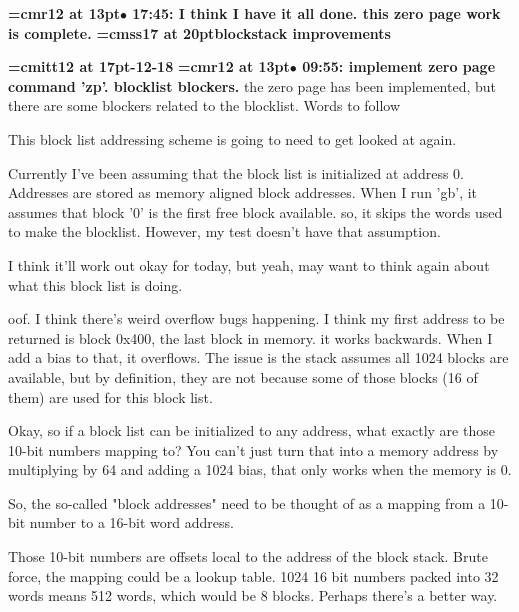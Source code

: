 {\smallskip\noindent\bf\font\titlefont=cmr12 at 13pt\titlefont $\bullet$ 17:45: I think I have it all done. this zero page work is complete.}\smallskip
{}
{\medskip\noindent\bf\font\titlefont=cmss17 at 20pt\titlefont blockstack improvements}\medskip

{\medskip\noindent\bf\font\titlefont=cmitt12 at 17pt-12-18}\medskip
{\smallskip\noindent\bf\font\titlefont=cmr12 at 13pt\titlefont $\bullet$ 09:55: implement zero page command 'zp'. blocklist blockers.}\smallskip
the zero page has been implemented, but there are some blockers related to the blocklist. Words to follow
\par

This block list addressing scheme is going to need to get looked at again.
\par

Currently I've been assuming that the block list is initialized at address 0. Addresses are stored as memory aligned block addresses. When I run 'gb', it assumes that block '0' is the first free block available. so, it skips the words used to make the blocklist. However, my test doesn't have that assumption.
\par

I think it'll work out okay for today, but yeah, may want to think again about what this block list is doing.
\par

oof. I think there's weird overflow bugs happening. I think my first address to be returned is block 0x400, the last block in memory. it works backwards. When I add a bias to that, it overflows. The issue is the stack assumes all 1024 blocks are available, but by definition, they are not because some of those blocks (16 of them) are used for this block list.
\par

Okay, so if a block list can be initialized to any address, what exactly are those 10-bit numbers mapping to? You can't just turn that into a memory address by multiplying by 64 and adding a 1024 bias, that only works when the memory is 0.
\par

So, the so-called "block addresses" need to be thought of as a mapping from a 10-bit number to a 16-bit word address.
\par

Those 10-bit numbers are offsets local to the address of the block stack. Brute force, the mapping could be a lookup table. 1024 16 bit numbers packed into 32 words means 512 words, which would be 8 blocks. Perhaps there's a better way.
\par

